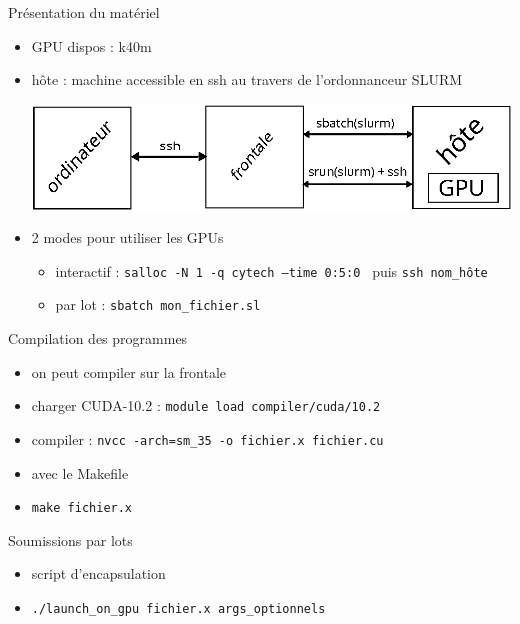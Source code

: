 \documentclass[11pt,mathserif]{beamer}
\begin{document}
\begin{frame}{Présentation du matériel}
  \begin{itemize}[<+->]
    \item GPU dispos : k40m
    \item hôte : machine accessible en ssh au travers de l'ordonnanceur SLURM
\pause
 \begin{center}
   \colorbox{white}{\includegraphics[width=0.7\linewidth]{fig/schema_slurm.eps}}
 \end{center}
    \item 2 modes pour utiliser les GPUs
      \begin{itemize}
        \item interactif : {\tt salloc -N 1 -q cytech --time 0:5:0 } puis {\tt ssh nom\_hôte}
        \item par lot : {\tt sbatch mon\_fichier.sl }
      \end{itemize}
  \end{itemize}
\end{frame}

\begin{frame}{Compilation des programmes}
  \begin{itemize}[<+->]
    \item on peut compiler sur la frontale
    \item charger CUDA-10.2 : {\tt module load compiler/cuda/10.2 }
    \item compiler : {\tt nvcc -arch=sm\_35 -o fichier.x fichier.cu}
    \item avec le Makefile
      
    \item {\tt make fichier.x }
  \end{itemize}
\end{frame}

\begin{frame}{Soumissions par lots}
  \begin{itemize}[<+->]
    \item script d'encapsulation
  \end{itemize}
      
  \begin{itemize}[<+->]
    \item {\tt ./launch\_on\_gpu fichier.x args\_optionnels}
  \end{itemize}
\end{frame}
\end{document}
